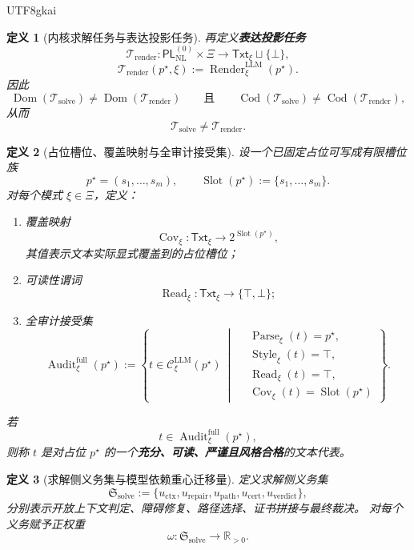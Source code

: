 \documentclass[12pt]{article}
\newtheorem{definition}{定义}[section]
\newcommand{\Parse}{\operatorname{Parse}}
\newcommand{\Audit}{\operatorname{Audit}}
\newcommand{\Render}{\operatorname{Render}}
\newcommand{\Style}{\operatorname{Style}}
\begin{document}
\begin{CJK*}{UTF8}{gkai}
\begin{definition}[内核求解任务与表达投影任务]
再定义\textbf{表达投影任务}
\[
  \mathcal{T}_{\mathrm{render}}:
  \mathsf{PL}_{\mathrm{NL}}^{(0)}\times \Xi
  \longrightarrow
  \mathsf{Txt}_\xi\sqcup\{\bot\},
\]
\[
  \mathcal{T}_{\mathrm{render}}(p^\star,\xi)
  :=
  \Render^{\mathrm{LLM}}_\xi(p^\star).
\]
因此
\[
  \operatorname{Dom}(\mathcal{T}_{\mathrm{solve}})
  \neq
  \operatorname{Dom}(\mathcal{T}_{\mathrm{render}})
  \qquad\text{且}\qquad
  \operatorname{Cod}(\mathcal{T}_{\mathrm{solve}})
  \neq
  \operatorname{Cod}(\mathcal{T}_{\mathrm{render}}),
\]
从而
\[
  \boxed{
    \mathcal{T}_{\mathrm{solve}}\neq \mathcal{T}_{\mathrm{render}}.
  }
\]
\end{definition}

\begin{definition}[占位槽位、覆盖映射与全审计接受集]
\label{def:tex37-ch5-coverage}
设一个已固定占位可写成有限槽位族
\[
  p^\star=(s_1,\dots,s_m),
  \qquad
  \operatorname{Slot}(p^\star):=\{s_1,\dots,s_m\}.
\]
对每个模式 $\xi\in\Xi$，定义：
\begin{enumerate}
  \item 覆盖映射
  \[
    \operatorname{Cov}_\xi:
    \mathsf{Txt}_\xi\to 2^{\operatorname{Slot}(p^\star)},
  \]
  其值表示文本实际显式覆盖到的占位槽位；
  \item 可读性谓词
  \[
    \operatorname{Read}_\xi:\mathsf{Txt}_\xi\to\{\top,\bot\};
  \]
  \item 全审计接受集
  \[
    \Audit^{\mathrm{full}}_\xi(p^\star)
    :=
    \left\{
      t\in \mathcal{C}^{\mathrm{LLM}}_\xi(p^\star)
      \ \middle|\
      \begin{aligned}
        &\Parse_\xi(t)=p^\star,\\
        &\Style_\xi(t)=\top,\\
        &\operatorname{Read}_\xi(t)=\top,\\
        &\operatorname{Cov}_\xi(t)=\operatorname{Slot}(p^\star)
      \end{aligned}
    \right\}.
  \]
\end{enumerate}
若
\[
  t\in\Audit^{\mathrm{full}}_\xi(p^\star),
\]
则称 $t$ 是对占位 $p^\star$ 的一个\textbf{充分、可读、严谨且风格合格}的文本代表。
\end{definition}

\begin{definition}[求解侧义务集与模型依赖重心迁移量]
\label{def:tex37-ch5-load}
定义求解侧义务集
\[
  \mathfrak{S}_{\mathrm{solve}}
  :=
  \{
    u_{\mathrm{ctx}},
    u_{\mathrm{repair}},
    u_{\mathrm{path}},
    u_{\mathrm{cert}},
    u_{\mathrm{verdict}}
  \},
\]
分别表示开放上下文判定、障碍修复、路径选择、证书拼接与最终裁决。
对每个义务赋予正权重
\[
  \omega:\mathfrak{S}_{\mathrm{solve}}\to \mathbb{R}_{>0}.
\]


\end{definition}
\end{CJK*}
\end{document}
